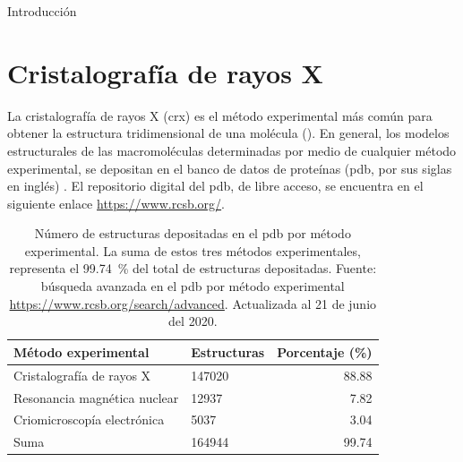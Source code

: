 {Introducción}
\section{Cristalografía de rayos X}
La cristalografía de rayos X (\acrshort{crx}) es el método experimental más común para obtener la estructura tridimensional de una molécula (). En general, los modelos estructurales de las macromoléculas determinadas por medio de cualquier método experimental, se depositan en el banco de datos de proteínas (\acrshort{pdb}, por sus siglas en inglés) . El repositorio digital del \acrshort{pdb}, de libre acceso, se encuentra en el siguiente enlace \url{https://www.rcsb.org/}. 

\begin{table}[h]
	\centering
	\begin{tabular}{@{}llr@{}}
		\toprule
		Método experimental & Estructuras  & Porcentaje (\si{\percent})       \\ 
		\midrule
		Cristalografía de rayos X & 147020 & 88.88	\\
		Resonancia magnética nuclear & 12937  & 7.82		\\
		Criomicroscopía electrónica & 5037   & 3.04		\\
		Suma   & 164944 & 99.74		\\ \bottomrule
	\end{tabular}%
	\caption[Número de estructuras por método experimental]{Número de estructuras depositadas en el \acrshort{pdb} por método experimental. La suma de estos tres métodos experimentales, representa el \SI{99.74}{\percent} del total de estructuras depositadas. Fuente: búsqueda avanzada en el \acrshort{pdb} por método experimental \url{https://www.rcsb.org/search/advanced}. Actualizada al 21 de junio del 2020.}
\end{table}

